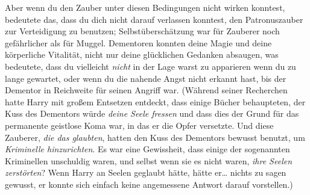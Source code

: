 Aber wenn du den Zauber unter diesen Bedingungen nicht wirken konntest, bedeutete das, dass du dich nicht darauf verlassen konntest, den Patronuszauber zur Verteidigung zu benutzen; Selbstüberschätzung war für Zauberer noch gefährlicher als für Muggel. Dementoren konnten deine Magie und deine körperliche Vitalität, nicht nur deine glücklichen Gedanken absaugen, was bedeutete, dass du vielleicht \emph{nicht} in der Lage warst zu apparieren wenn du zu lange gewartet, oder wenn du die nahende Angst nicht erkannt hast, bis der Dementor in Reichweite für seinen Angriff war. (Während seiner Recherchen hatte Harry mit großem Entsetzen entdeckt, dass einige Bücher behaupteten, der Kuss des Dementors würde \emph{deine Seele fressen} und dass dies der Grund für das permanente geistlose Koma war, in das er die Opfer versetzte. Und diese Zauberer, \emph{die das glaubten}, hatten den Kuss des Dementors bewusst benutzt, um \emph{Kriminelle hinzurichten}. Es war eine Gewissheit, dass einige der sogenannten Kriminellen unschuldig waren, und selbst wenn sie es nicht waren, \emph{ihre Seelen zerstörten}? Wenn Harry an Seelen geglaubt hätte, hätte er… nichts zu sagen gewusst, er konnte sich einfach keine angemessene Antwort darauf vorstellen.)

